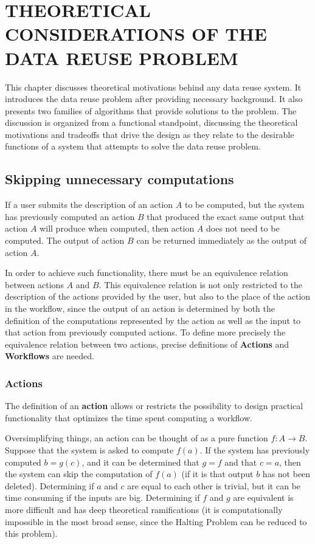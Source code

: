 \chapter{THEORETICAL CONSIDERATIONS OF THE DATA REUSE PROBLEM}
\label{chap:foundational}
This chapter discusses theoretical motivations behind any data reuse system.  It introduces the data reuse problem after providing necessary background. It also presents two families of algorithms that provide solutions to the problem. The discussion is organized from a functional standpoint, discussing the theoretical motivations and tradeoffs that drive the design as they relate to the desirable functions of a system that attempts to solve the data reuse problem.

\section{Skipping unnecessary computations}
If a user submits the description of an action $A$ to be computed, but the system has previously computed an action $B$ that produced the exact same output that action $A$ will produce when computed, then action $A$ does not need to be computed.  The output of action $B$ can be returned immediately as the output of action $A$.  

In order to achieve such functionality, there must be an equivalence relation between actions $A$ and $B$. This equivalence relation is not only restricted to the description of the actions provided by the user, but also to the place of the action in the workflow, since the output of an action is determined by both the definition of the computations represented by the action as well as the input to that action from previously computed actions. To define more precisely the equivalence relation between two actions, precise definitions of \textbf{Actions} and \textbf{Workflows} are needed.

\subsection{Actions}
The definition of an \textbf{action} allows or restricts the possibility to design practical functionality that optimizes the time spent computing a workflow. 

Oversimplifying things, an action can be thought of as a pure function $f:A \rightarrow B$.  Suppose that the system is asked to compute $f(a)$.  If the system has previously computed $b=g(c)$, and it can be determined that $g=f$ and that $c=a$, then the system can skip the computation of $f(a)$ (if it is that output $b$ has not been deleted).  Determining if $a$ and $c$ are equal to each other is trivial, but it can be time consuming if the inputs are big.  Determining if $f$ and $g$ are equivalent is more difficult and has deep theoretical ramifications (it is computationally impossible in the most broad sense, since the Halting Problem can be reduced to this problem).

